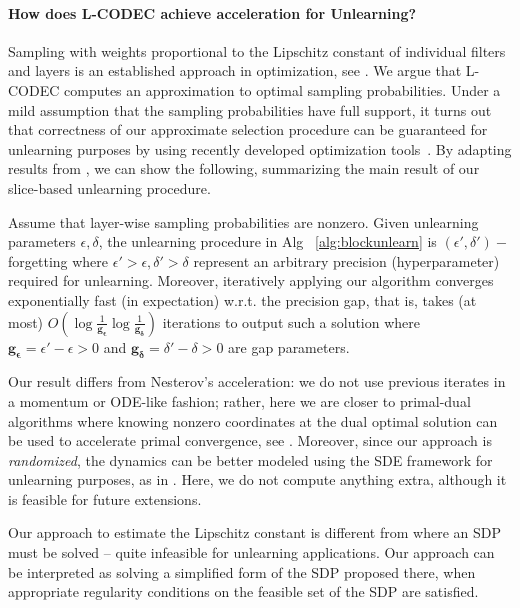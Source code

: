 \paragraph{How does L-CODEC achieve acceleration for Unlearning?}
Sampling with weights proportional to the Lipschitz constant of individual filters and layers is an established approach in optimization, see \cite{gorbunov2020unified}. We argue that L-CODEC computes an approximation to optimal sampling probabilities.
Under a mild assumption that the sampling probabilities have full support, it turns out that correctness of our approximate selection procedure can be guaranteed for unlearning purposes by using recently developed optimization tools~\citep{gower2019sgd}. By adapting results from \cite{gorbunov2020unified}, we can show the following, summarizing the main result of our slice-based unlearning procedure.
\begin{theorem}\label{thm:fociconv}
Assume that layer-wise sampling probabilities are nonzero. Given unlearning parameters $\epsilon,\delta$, the unlearning procedure in Alg~ \ref{alg:blockunlearn} is $(\epsilon',\delta')-$forgetting where $\epsilon'>\epsilon,\delta'>\delta$ represent an arbitrary  precision (hyperparameter) required for unlearning. Moreover, iteratively applying our algorithm converges exponentially fast (in expectation) w.r.t. the precision gap, that is, takes (at most) $O(\log\frac{1}{\mathbf{g_{\epsilon}}}\log\frac{1}{\mathbf{g_{\delta}}})$ iterations to output such a solution where  $\mathbf{g_{\epsilon}} = \epsilon'-\epsilon>0$ and $\mathbf{g_{\delta}}=\delta'-\delta>0$ are gap parameters.
\end{theorem}
Our result differs from Nesterov's acceleration: we do not use previous iterates in a momentum or ODE-like fashion; rather, here we are closer to primal-dual algorithms where knowing nonzero coordinates at the dual optimal solution  
can be used to accelerate primal convergence, see \cite{diakonikolas2019approximate}. Moreover, since our approach is \textit{randomized}, the dynamics can be better modeled using the SDE framework for unlearning purposes, as in \cite{simsekli2020fractional}. 
Here, we do not compute anything extra, although it is feasible for future extensions.
\begin{remark}
Our approach to estimate the Lipschitz constant is different from \cite{fazlyab2019efficient} where an SDP must be solved -- quite infeasible for unlearning applications. Our approach can be interpreted as solving a simplified form of the SDP proposed there, when appropriate regularity conditions on the feasible set of the SDP are satisfied. %
\end{remark}

